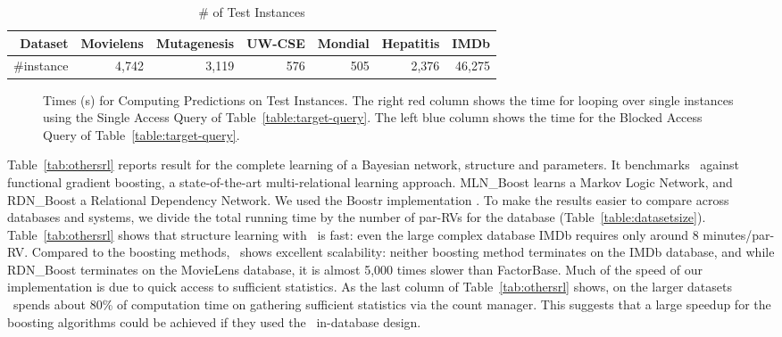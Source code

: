 \documentclass{IEEEtran}
\begin{document}
\begin{table}[htbp]
\caption{\# of Test Instances }
  \centering
  \begin{tabular}{|r|r|r|r|r|r|r|} \hline
\textbf{Dataset}&Movielens&	Mutagenesis	& 	UW-CSE	&	Mondial&	Hepatitis&	 	IMDb \\ \hline
{\#instance}	&4,742	 	&	3,119		&576	&		505&2,376	 	&46,275 \\ \hline
    
\end{tabular}%
  \label{tab:test-instance}%
\end{table}%

\begin{figure}[htbp] %
 \centering
{} 
\caption{Times (s) for Computing Predictions on Test Instances. The right red column shows the time for looping over single instances using the Single Access Query of Table~\ref{table:target-query}. The left blue column shows the time for the Blocked Access Query of Table~\ref{table:target-query}.
}
 \label{fig:test-timing}
\end{figure}




Table~\ref{tab:othersrl} reports result for the complete learning of a Bayesian network, structure and parameters. It benchmarks \FB\ against functional gradient boosting, a state-of-the-art  multi-relational learning approach.
MLN\_Boost learns a Markov Logic Network, and RDN\_Boost a Relational Dependency Network. 
We used the Boostr implementation \cite{Khot2013}. 
To make the results easier to compare across databases and systems, we divide the total running time by the number of par-RVs for the database (Table~\ref{table:datasetsize}). 
Table~\ref{tab:othersrl} shows that structure learning with \FB\ is fast: even the large complex database IMDb requires only around 8 minutes/par-RV. Compared to the boosting methods, \FB\ shows excellent scalability: neither boosting method terminates on the IMDb database, and while RDN\_Boost terminates on the MovieLens database, it is almost 5,000 times slower than {\sc FactorBase}. 
Much of the speed of our implementation is due to quick access to sufficient statistics. As the last column of Table~\ref{tab:othersrl} shows, on the larger datasets \FB\ spends about 80\% of computation time on gathering sufficient statistics via the count manager. This suggests that a large  speedup for the boosting algorithms could be achieved if they used the \FB\ in-database design. 
\end{document}
